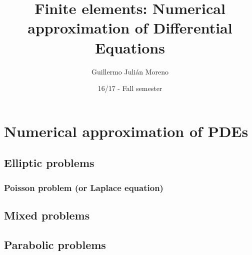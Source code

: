 \documentclass[palatino,twoside]{epflnotes}
\title{Finite elements: Numerical approximation of Differential Equations}
\author{Guillermo Julián Moreno}
\date{16/17 - Fall semester}
\newif\ifincludefirstsemester
\begin{document}
\frontmatter
\pagestyle{plain}
\maketitle

\tableofcontents
\mainmatter

\ifincludefirstsemester
\part{Prelude: Fundamentals on analysis}


\part{Theory of finite elements}


\part{Numerical approximation of ODEs}

\fi

\part{Numerical approximation of PDEs}

\chapter{Elliptic problems}

\section{Poisson problem (or Laplace equation)}
\ifincludefirstsemester\fi


\ifincludefirstsemester\fi


\chapter{Mixed problems}
\ifincludefirstsemester\fi


\chapter{Parabolic problems}

\end{document}
